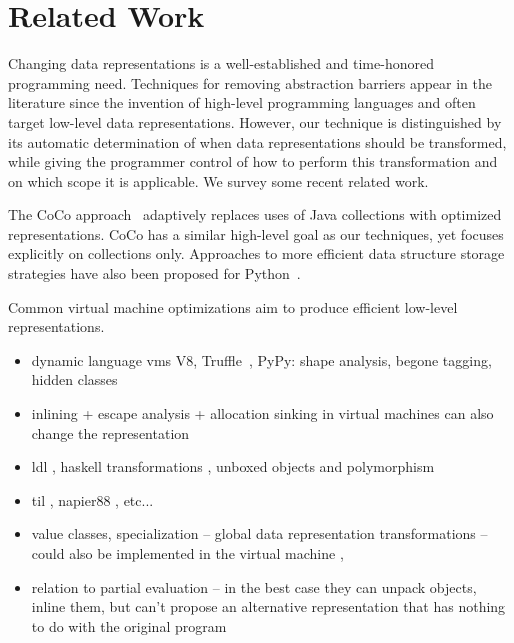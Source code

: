 \section{Related Work}
\label{sec:related}



Changing data representations is a well-established and time-honored
programming need. Techniques for removing abstraction barriers appear
in the literature since the invention of high-level programming
languages and often target low-level data representations. However,
our technique is distinguished by its automatic determination of when
data representations should be transformed, while giving the
programmer control of how to perform this transformation and on which
scope it is applicable. We survey some recent related work.

The CoCo approach~\cite{Xu:2013:CSA:2524984.2524986} adaptively
replaces uses of Java collections with optimized representations.
CoCo has a similar high-level goal as our techniques, yet focuses
explicitly on collections only. Approaches to more efficient data
structure storage strategies have also been proposed for
Python~\cite{Bolz:2013:SSC:2509136.2509531}.

Common virtual machine optimizations aim to produce efficient low-level
representations.


\begin{itemize}
  \item dynamic language vms V8, Truffle~\cite{Wurthinger:2013:OVR:2509578.2509581}, PyPy: shape analysis, begone tagging, hidden classes
  \item inlining + escape analysis + allocation sinking in virtual machines can also change the representation
  \item ldl \cite{ldl}, haskell transformations \cite{spj-unboxed-values} \cite{thiemann-unboxed-objects-cps} \cite{shao-flexible-representation-analysis}, unboxed objects and polymorphism \cite{leroy-unboxed-objects}
  \item til \cite{tarditi-til} \cite{harper-intensional-type-analysis}, napier88 \cite{morrison-napier88}, etc...
  \item value classes\cite{sip-value-classes}, specialization \cite{iuli-thesis} \cite{miniboxing} -- global data representation transformations -- could also be implemented in the virtual machine \cite{goetz-specialization}, \cite{rose-value-classes-vm} \cite{rose-value-classes-tearing}
  \item relation to partial evaluation -- in the best case they can unpack objects, inline them, but can't propose an alternative representation that has nothing to do with the original program
\end{itemize}
